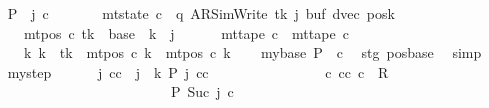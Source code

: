 \begin{isabellebody}
\ \ \isamarkupfalse%
\ {\isacharquery}{\kern0pt}P\ {\isacharequal}{\kern0pt}\ {\isachardoublequoteopen}{\isasymlambda}j\ c{\isachardot}{\kern0pt}\isanewline
\ \ \ \ \ \ \ mt{\isacharunderscore}{\kern0pt}state\ c\ {\isacharequal}{\kern0pt}\ {\isacharparenleft}{\kern0pt}q{\isacharcomma}{\kern0pt}\ AR{\isacharunderscore}{\kern0pt}SimWrite{\isacharcomma}{\kern0pt}\ tk{\isacharcomma}{\kern0pt}\ j{\isacharcomma}{\kern0pt}\ buf{\isacharcomma}{\kern0pt}\ dvec{\isacharcomma}{\kern0pt}\ posk{\isacharparenright}{\kern0pt}\isanewline
\ \ \ \ \ {\isasymand}\ mt{\isacharunderscore}{\kern0pt}pos\ c\ tk\ {\isacharequal}{\kern0pt}\ base\ {\isacharplus}{\kern0pt}\ {\isacharparenleft}{\kern0pt}{\isacharquery}{\kern0pt}k\ {\isacharminus}{\kern0pt}\ j{\isacharparenright}{\kern0pt}\isanewline
\ \ \ \ \ {\isasymand}\ mt{\isacharunderscore}{\kern0pt}tape\ c\ {\isacharequal}{\kern0pt}\ mt{\isacharunderscore}{\kern0pt}tape\ c{}\isanewline
\ \ \ \ \ {\isasymand}\ {\isacharparenleft}{\kern0pt}{\isasymforall}k{\isacharprime}{\kern0pt}{\isachardot}{\kern0pt}\ k{\isacharprime}{\kern0pt}\ {\isasymnoteq}\ tk\ {\isasymlongrightarrow}\ mt{\isacharunderscore}{\kern0pt}pos\ c\ k{\isacharprime}{\kern0pt}\ {\isacharequal}{\kern0pt}\ mt{\isacharunderscore}{\kern0pt}pos\ c{}\ k{\isacharprime}{\kern0pt}{\isacharparenright}{\kern0pt}{\isachardoublequoteclose}\isanewline
\ \ \isamarkupfalse%
\ mybase{\isacharcolon}{\kern0pt}\ {\isachardoublequoteopen}{\isacharquery}{\kern0pt}P\ {}\ c{}{\isachardoublequoteclose}\ \isamarkupfalse%
\ stg\ pos{\isacharunderscore}{\kern0pt}base\ \isamarkupfalse%
\ simp\isanewline
\ \ \isamarkupfalse%
\ mystep{\isacharcolon}{\kern0pt}\isanewline
\ \ \ \ \ \ {\isachardoublequoteopen}{\isasymAnd}j\ cc{\isachardot}{\kern0pt}\ {\isasymlbrakk}\ j\ {\isacharless}{\kern0pt}\ {\isacharquery}{\kern0pt}k{\isacharsemicolon}{\kern0pt}\ {\isacharquery}{\kern0pt}P\ j\ cc\ {\isasymrbrakk}\isanewline
\ \ \ \ \ \ \ \ \ \ \ \ \ \ {\isasymLongrightarrow}\ {\isasymexists}c{\isacharprime}{\kern0pt}{\isacharprime}{\kern0pt}{\isachardot}{\kern0pt}\ {\isacharparenleft}{\kern0pt}cc{\isacharcomma}{\kern0pt}\ c{\isacharprime}{\kern0pt}{\isacharprime}{\kern0pt}{\isacharparenright}{\kern0pt}\ {\isasymin}\ R{\isacharprime}{\kern0pt}\isanewline
\ \ \ \ \ \ \ \ \ \ \ \ \ \ \ \ \ \ \ \ \ \ \ \ \ \ {\isasymand}\ {\isacharquery}{\kern0pt}P\ {\isacharparenleft}{\kern0pt}Suc\ j{\isacharparenright}{\kern0pt}\ c{\isacharprime}{\kern0pt}{\isacharprime}{\kern0pt}{\isachardoublequoteclose}\isanewline

\end{isabellebody}
